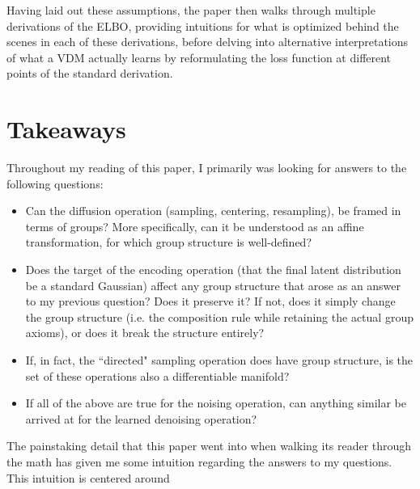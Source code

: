 \documentclass{article}
\begin{document}
Having laid out these assumptions, the paper then walks through multiple derivations of the ELBO, providing intuitions for what is optimized behind the scenes in each of these derivations, before delving into alternative interpretations of what a VDM actually learns by reformulating the loss function at different points of the standard derivation.

\section*{Takeaways}
Throughout my reading of this paper, I primarily was looking for answers to the following questions:
\begin{itemize}
\item Can the diffusion operation (sampling, centering, resampling), be framed in terms of groups? More specifically, can it be understood as an affine transformation, for which group structure is well-defined?
\item Does the target of the encoding operation (that the final latent distribution be a standard Gaussian) affect any group structure that arose as an answer to my previous question? Does it preserve it? If not, does it simply change the group structure (i.e. the composition rule while retaining the actual group axioms), or does it break the structure entirely?
\item If, in fact, the ``directed" sampling operation does have group structure, is the set of these operations also a differentiable manifold?
\item If all of the above are true for the noising operation, can anything similar be arrived at for the learned denoising operation?
\end{itemize}
The painstaking detail that this paper went into when walking its reader through the math has given me some intuition regarding the answers to my questions. This intuition is centered around 
\end{document}
